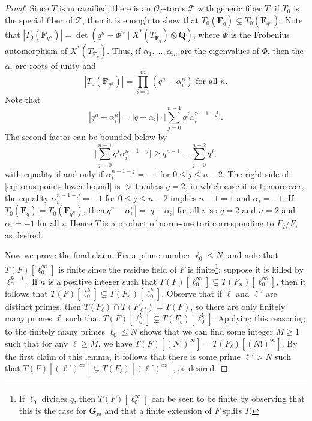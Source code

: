 \documentclass[reqno]{amsart}
\numberwithin{equation}{subsection}
\newcommand{\F}{\mathbf{F}}
\newcommand{\G}{\mathbf{G}}
\newcommand{\Q}{\mathbf{Q}}
\newcommand{\ol}[1]{\overline{#1}}
\newcommand\cO{\mathcal{O}}
\newcommand\cT{\mathcal{T}}
\theoremstyle{remark}
\numberwithin{equation}{subsection}
\numberwithin{figure}{subsection}
\begin{document}
\begin{proof}
Since $T$ is unramified, there is an $\cO_F$-torus $\cT$ with generic fiber $T$; if $T_0$ is the special fiber of $\cT$, then it is enough to show that $T_0(\F_q) \subsetneq T_0(\F_{q^n})$. Note that $|T_0(\F_{q^n})|=\det(q^n-\Phi^n\mid X^*(T_{\ol\F_q})\otimes\Q)$, where $\Phi$ is the Frobenius automorphism of $X^*(T_{\ol\F_q})$. Thus, if $\alpha_1,\dots,\alpha_m$ are the eigenvalues of $\Phi$, then the $\alpha_i$ are roots of unity and
\[
|T_0(\F_{q^n})| = \prod_{i=1}^m (q^n - \alpha_i^n) \text{ for all $n$}.
\]
Note that 
\[
|q^n - \alpha_i^n| = |q - \alpha_i| \cdot \Big|\sum_{j=0}^{n-1} q^j\alpha_i^{n-1-j}\Big|.
\]
The second factor can be bounded below by
\begin{equation}\label{eq:torus-points-lower-bound}
\Big|\sum_{j=0}^{n-1} q^j\alpha_i^{n-1-j} \Big| \geq q^{n-1} - \sum_{j=0}^{n-2} q^j,
\end{equation}
with equality if and only if $\alpha_i^{n-1-j}=-1$ for $0\leq j\leq n-2$. The right side of \eqref{eq:torus-points-lower-bound} is $>1$ unless $q=2$, in which case it is $1$; moreover, the equality $\alpha_i^{n-1-j}=-1$ for $0\leq j\leq n-2$ implies $n-1=1$ and $\alpha_i=-1$. If $T_0(\F_q) = T_0(\F_{q^n})$, then$|q^n - \alpha_i^n| = |q - \alpha_i|$ for all $i$, so $q = 2$ and $n = 2$ and $\alpha_i = -1$ for all $i$. Hence $T$ is a product of norm-one tori corresponding to $F_2/F$, as desired.

Now we prove the final claim. Fix a prime number $\ell_0 \leq N$, and note that $T(F)[\ell_0^\infty]$ is finite since the residue field of $F$ is finite\footnote{If $\ell_0$ divides $q$, then $T(F)[\ell_0^\infty]$ can be seen to be finite by observing that this is the case for $\G_{\mathrm{m}}$ and that a finite extension of $F$ splits $T$.}; suppose it is killed by $\ell_0^{k-1}$. If $n$ is a positive integer such that $T(F)[\ell_0^\infty] \subsetneq T(F_n)[\ell_0^\infty]$, then it follows that $T(F)[\ell_0^k] \subsetneq T(F_n)[\ell_0^k]$. Observe that if $\ell$ and $\ell'$ are distinct primes, then $T(F_\ell) \cap T(F_{\ell'}) = T(F)$, so there are only finitely many primes $\ell$ such that $T(F)[\ell_0^k] \subsetneq T(F_\ell)[\ell_0^k]$. Applying this reasoning to the finitely many primes $\ell_0 \leq N$ shows that we can find some integer $M \geq 1$ such that for any $\ell \geq M$, we have $T(F)[(N!)^\infty] = T(F_\ell)[(N!)^\infty]$. By the first claim of this lemma, it follows that there is some prime $\ell' > N$ such that $T(F)[(\ell')^\infty] \subsetneq T(F_\ell)[(\ell')^\infty]$, as desired. 
\end{proof}
\end{document}
